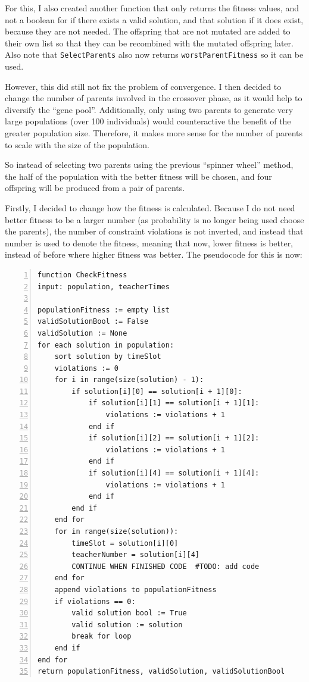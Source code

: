 \documentclass[a4paper, 12pt]{report}
\begin{document}
For this, I also created another function that only returns the fitness values, 
and not a boolean for if there exists a valid solution, and that solution if it
does exist, because they are not needed.
The offspring that are not mutated are added to their own list so that they can
be recombined with the mutated offspring later.
Also note that \verb|SelectParents| also now returns \verb|worstParentFitness| 
so it can be used.

However, this did still not fix the problem of convergence. 
I then decided to change the number of parents involved in the crossover phase,
as it would help to diversify the ``gene pool''.
Additionally, only using two parents to generate very large populations (over 
100 individuals) would counteractive the benefit of the greater population size.
Therefore, it makes more sense for the number of parents to scale with the size
of the population.

So instead of selecting two parents using the previous ``spinner wheel'' method,
the half of the population with the better fitness will be chosen, and four 
offspring will be produced from a pair of parents.

Firstly, I decided to change how the fitness is calculated.
Because I do not need better fitness to be a larger number (as probability is no
longer being used choose the parents), the number of constraint violations is
not inverted, and instead that number is used to denote the fitness, meaning
that now, lower fitness is better, instead of before where higher fitness was 
better.
The pseudocode for this is now:

\begin{Verbatim}[numbers=left, fontsize=\footnotesize, tabsize=4]
function CheckFitness
input: population, teacherTimes
	
populationFitness := empty list
validSolutionBool := False
validSolution := None
for each solution in population:
	sort solution by timeSlot
	violations := 0
	for i in range(size(solution) - 1):
		if solution[i][0] == solution[i + 1][0]:
			if solution[i][1] == solution[i + 1][1]:
				violations := violations + 1
			end if
			if solution[i][2] == solution[i + 1][2]:
				violations := violations + 1
			end if
			if solution[i][4] == solution[i + 1][4]:
				violations := violations + 1
			end if
		end if
	end for
	for in range(size(solution)):
		timeSlot = solution[i][0]
		teacherNumber = solution[i][4]
		CONTINUE WHEN FINISHED CODE  #TODO: add code
	end for
	append violations to populationFitness
	if violations == 0:
		valid solution bool := True
		valid solution := solution
		break for loop
	end if
end for
return populationFitness, validSolution, validSolutionBool
\end{Verbatim}
\end{document}
